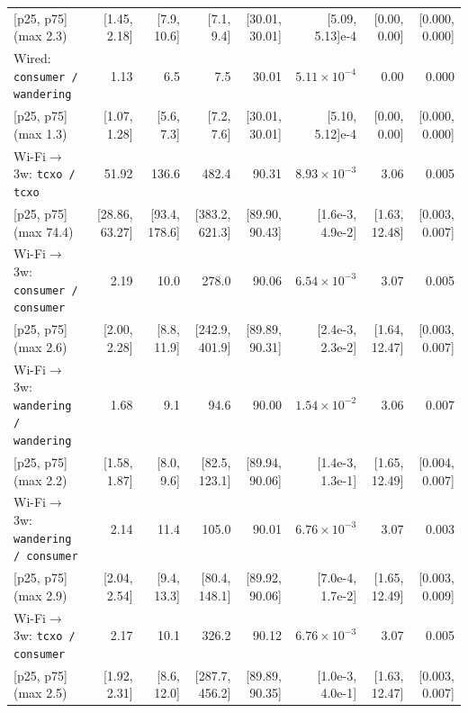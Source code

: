 \documentclass[11pt,a4paper]{article}
\theoremstyle{definition}
\begin{document}
\begin{table}[htb]
\begin{tabular}{@{}l r r r r r r r@{}}
\quad\tiny [p25, p75] (max 2.3) & \tiny [1.45, 2.18] & \tiny [7.9, 10.6] & \tiny [7.1, 9.4] & \tiny [30.01, 30.01] & \tiny [5.09, 5.13]e-4 & \tiny [0.00, 0.00] & \tiny [0.000, 0.000] \\
\addlinespace[1pt]
Wired: \texttt{consumer / wandering} & 1.13 & 6.5 & 7.5 & 30.01 & $5.11{\times}10^{-4}$ & 0.00 & 0.000 \\[-1pt]
\quad\tiny [p25, p75] (max 1.3) & \tiny [1.07, 1.28] & \tiny [5.6, 7.3] & \tiny [7.2, 7.6] & \tiny [30.01, 30.01] & \tiny [5.10, 5.12]e-4 & \tiny [0.00, 0.00] & \tiny [0.000, 0.000] \\
\addlinespace[2pt]
Wi-Fi$\to$3w: \texttt{tcxo / tcxo} & 51.92 & 136.6 & 482.4 & 90.31 & $8.93{\times}10^{-3}$ & 3.06 & 0.005 \\[-1pt]
\quad\tiny [p25, p75] (max 74.4) & \tiny [28.86, 63.27] & \tiny [93.4, 178.6] & \tiny [383.2, 621.3] & \tiny [89.90, 90.43] & \tiny [1.6e-3, 4.9e-2] & \tiny [1.63, 12.48] & \tiny [0.003, 0.007] \\
\addlinespace[1pt]
Wi-Fi$\to$3w: \texttt{consumer / consumer} & 2.19 & 10.0 & 278.0 & 90.06 & $6.54{\times}10^{-3}$ & 3.07 & 0.005 \\[-1pt]
\quad\tiny [p25, p75] (max 2.6) & \tiny [2.00, 2.28] & \tiny [8.8, 11.9] & \tiny [242.9, 401.9] & \tiny [89.89, 90.31] & \tiny [2.4e-3, 2.3e-2] & \tiny [1.64, 12.47] & \tiny [0.003, 0.007] \\
\addlinespace[1pt]
Wi-Fi$\to$3w: \texttt{wandering / wandering} & 1.68 & 9.1 & 94.6 & 90.00 & $1.54{\times}10^{-2}$ & 3.06 & 0.007 \\[-1pt]
\quad\tiny [p25, p75] (max 2.2) & \tiny [1.58, 1.87] & \tiny [8.0, 9.6] & \tiny [82.5, 123.1] & \tiny [89.94, 90.06] & \tiny [1.4e-3, 1.3e-1] & \tiny [1.65, 12.49] & \tiny [0.004, 0.007] \\
\addlinespace[1pt]
Wi-Fi$\to$3w: \texttt{wandering / consumer} & 2.14 & 11.4 & 105.0 & 90.01 & $6.76{\times}10^{-3}$ & 3.07 & 0.003 \\[-1pt]
\quad\tiny [p25, p75] (max 2.9) & \tiny [2.04, 2.54] & \tiny [9.4, 13.3] & \tiny [80.4, 148.1] & \tiny [89.92, 90.06] & \tiny [7.0e-4, 1.7e-2] & \tiny [1.65, 12.49] & \tiny [0.003, 0.009] \\
\addlinespace[1pt]
Wi-Fi$\to$3w: \texttt{tcxo / consumer} & 2.17 & 10.1 & 326.2 & 90.12 & $6.76{\times}10^{-3}$ & 3.07 & 0.005 \\[-1pt]
\quad\tiny [p25, p75] (max 2.5) & \tiny [1.92, 2.31] & \tiny [8.6, 12.0] & \tiny [287.7, 456.2] & \tiny [89.89, 90.35] & \tiny [1.0e-3, 4.0e-1] & \tiny [1.63, 12.47] & \tiny [0.003, 0.007] \\

\end{tabular}
\end{table}
\end{document}
